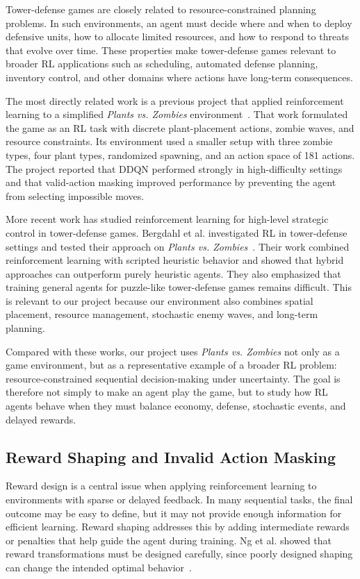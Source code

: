 \documentclass[conference,onecolumn]{IEEEtran}
\begin{document}
Tower-defense games are closely related to resource-constrained planning problems. In such environments, an agent must decide where and when to deploy defensive units, how to allocate limited resources, and how to respond to threats that evolve over time. These properties make tower-defense games relevant to broader RL applications such as scheduling, automated defense planning, inventory control, and other domains where actions have long-term consequences.

The most directly related work is a previous project that applied reinforcement learning to a simplified \textit{Plants vs. Zombies} environment~\cite{blondiauxplants}. That work formulated the game as an RL task with discrete plant-placement actions, zombie waves, and resource constraints. Its environment used a smaller setup with three zombie types, four plant types, randomized spawning, and an action space of 181 actions. The project reported that DDQN performed strongly in high-difficulty settings and that valid-action masking improved performance by preventing the agent from selecting impossible moves.

More recent work has studied reinforcement learning for high-level strategic control in tower-defense games. Bergdahl et al. investigated RL in tower-defense settings and tested their approach on \textit{Plants vs. Zombies}~\cite{bergdahl2024reinforcement}. Their work combined reinforcement learning with scripted heuristic behavior and showed that hybrid approaches can outperform purely heuristic agents. They also emphasized that training general agents for puzzle-like tower-defense games remains difficult. This is relevant to our project because our environment also combines spatial placement, resource management, stochastic enemy waves, and long-term planning.

Compared with these works, our project uses \textit{Plants vs. Zombies} not only as a game environment, but as a representative example of a broader RL problem: resource-constrained sequential decision-making under uncertainty. The goal is therefore not simply to make an agent play the game, but to study how RL agents behave when they must balance economy, defense, stochastic events, and delayed rewards.

\subsection{Reward Shaping and Invalid Action Masking}

Reward design is a central issue when applying reinforcement learning to environments with sparse or delayed feedback. In many sequential tasks, the final outcome may be easy to define, but it may not provide enough information for efficient learning. Reward shaping addresses this by adding intermediate rewards or penalties that help guide the agent during training. Ng et al. showed that reward transformations must be designed carefully, since poorly designed shaping can change the intended optimal behavior~\cite{ng1999policy}.
\end{document}
